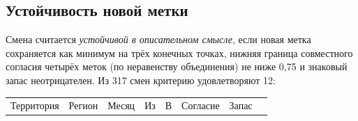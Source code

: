 \documentclass[11pt,a4paper]{article}
\newcounter{none}\def\LTcaptype{none}
\begin{document}
\subsection{Устойчивость новой метки}\label{ux443ux441ux442ux43eux439ux447ux438ux432ux43eux441ux442ux44c-ux43dux43eux432ux43eux439-ux43cux435ux442ux43aux438}

Смена считается \emph{устойчивой в описательном смысле}, если новая метка сохраняется как минимум на трёх конечных точках, нижняя граница совместного согласия четырёх меток (по неравенству объединения) не ниже 0,75 и знаковый запас неотрицателен. Из 317 смен критерию удовлетворяют 12:

\begingroup\footnotesize\setlength{\tabcolsep}{4pt}

{\def\LTcaptype{none} %
\begin{longtable}[]{@{}
  >{\raggedright\arraybackslash}p{}
  >{\raggedright\arraybackslash}p{}
  >{\raggedright\arraybackslash}p{}
  >{\raggedright\arraybackslash}p{}
  >{\raggedright\arraybackslash}p{}
  >{\raggedright\arraybackslash}p{}
  >{\raggedright\arraybackslash}p{}
  >{\raggedright\arraybackslash}p{}@{}}
\toprule\noalign{}
\begin{minipage}[b]{\linewidth}\raggedright
Территория
\end{minipage} & \begin{minipage}[b]{\linewidth}\raggedright
Регион
\end{minipage} & \begin{minipage}[b]{\linewidth}\raggedright
Месяц
\end{minipage} & \begin{minipage}[b]{\linewidth}\raggedright
Из
\end{minipage} & \begin{minipage}[b]{\linewidth}\raggedright
В
\end{minipage} & \begin{minipage}[b]{\linewidth}\raggedright
Согласие
\end{minipage} & \begin{minipage}[b]{\linewidth}\raggedright
Запас
\end{minipage} & \begin{minipage}[b]{\linewidth}\raggedright

\end{minipage}
\end{longtable}}
\end{document}
